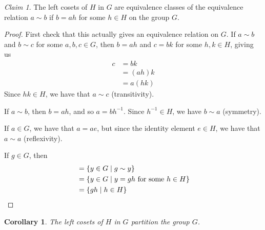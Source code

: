 \documentclass[12pt,letterpaper,DIV=11,final]{scrartcl}
\theoremstyle{plain}
\newtheorem{corollary}{Corollary}
\theoremstyle{definition}
\theoremstyle{remark}
\newtheorem{claim}{Claim}
\begin{document}
\begin{claim}
  The left cosets of $H$ in $G$ are equivalence classes of the equivalence relation $a \sim b$ if $b = ah$ for some $h \in H$ on the group $G$.

  \begin{proof}
    First check that this actually gives an equivalence relation on $G$.
    If $a \sim b$ and $b \sim c$ for some $a, b, c \in G$, then $b = ah$ and $c = bk$ for some $h, k \in H$, giving us
    \begin{align*}
      c &= bk \\
        &= (ah) k \\
        &= a (hk)
    \end{align*}
		Since $hk \in H$, we have that $a \sim c$ (transitivity).

		If $a \sim b$, then $b = ah$, and so $a = b h^{-1}$.
		Since $h^{-1} \in H$, we have $b \sim a$ (symmetry).

		If $a \in G$, we have that $a = ae$, but since the identity element $e \in H$, we have that $a \sim a$ (reflexivity).

		If $g \in G$, then
		\begin{align*}
		  [g] &= \{ y \in G \mid g \sim y \} \\
		      &= \{ y \in G \mid y = gh \text{ for some } h \in H \} \\
          &= \{ gh \mid h \in H \} \qedhere
	  \end{align*}
  \end{proof}
\end{claim}

\begin{corollary}
  The left cosets of $H$ in $G$ partition the group $G$.
\end{corollary}
\end{document}

